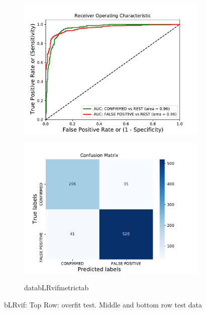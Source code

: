 \begin{figure}[H]
\begin{subfigure}{.49\textwidth}
                \includegraphics[width = 1\textwidth]{data/bLR_vif_roc.pdf}
                \end{subfigure}
                \begin{subfigure}{.49\textwidth}
                \includegraphics[width = 1\textwidth]{data/bLR_vif_cm.pdf}
                \end{subfigure}
                \begin{subfigure}{1\textwidth}
                \csname databLRvifmetrictab\endcsname
                \end{subfigure}
                \caption{bLRvif: Top Row: overfit test. Middle and bottom row test data}
                \label{fig:data/bLR_vif_roc}
                \end{figure}